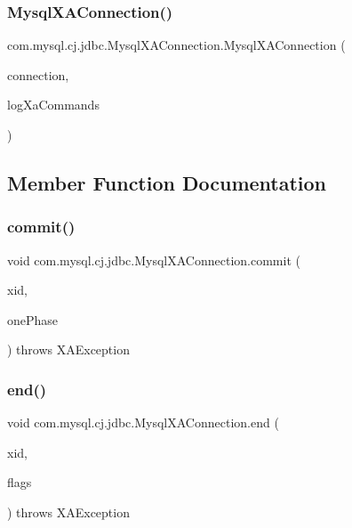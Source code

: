 \subsubsection{\texorpdfstring{Mysql\+X\+A\+Connection()}{MysqlXAConnection()}}
{\footnotesize\ttfamily com.\+mysql.\+cj.\+jdbc.\+Mysql\+X\+A\+Connection.\+Mysql\+X\+A\+Connection (\begin{DoxyParamCaption}\item[{\mbox{\hyperlink{interfacecom_1_1mysql_1_1cj_1_1jdbc_1_1_jdbc_connection}{Jdbc\+Connection}}}]{connection,  }\item[{boolean}]{log\+Xa\+Commands }\end{DoxyParamCaption})}



\subsection{Member Function Documentation}
\mbox{\label{classcom_1_1mysql_1_1cj_1_1jdbc_1_1_mysql_x_a_connection_a8ce071c6596c3f33c815fbe697fd619c}} 
\subsubsection{\texorpdfstring{commit()}{commit()}}
{\footnotesize\ttfamily void com.\+mysql.\+cj.\+jdbc.\+Mysql\+X\+A\+Connection.\+commit (\begin{DoxyParamCaption}\item[{Xid}]{xid,  }\item[{boolean}]{one\+Phase }\end{DoxyParamCaption}) throws X\+A\+Exception}

\mbox{\label{classcom_1_1mysql_1_1cj_1_1jdbc_1_1_mysql_x_a_connection_a6f20466a27da1aa3a0e5dabb3255d49b}} 
\subsubsection{\texorpdfstring{end()}{end()}}
{\footnotesize\ttfamily void com.\+mysql.\+cj.\+jdbc.\+Mysql\+X\+A\+Connection.\+end (\begin{DoxyParamCaption}\item[{Xid}]{xid,  }\item[{int}]{flags }\end{DoxyParamCaption}) throws X\+A\+Exception}

